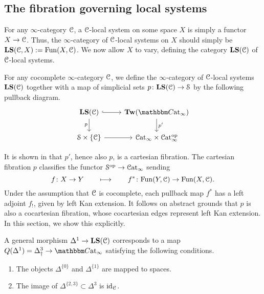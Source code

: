 \documentclass[main.tex]{subfiles}
\begin{document}
\subsection{The fibration governing local systems}
\label{ssc:the_fibration}

For any $\infty$-category $\mathcal{C}$, a $\mathcal{C}$-local system on some space $X$ is simply a functor $X \to \mathcal{C}$. Thus, the $\infty$-category of $\mathcal{C}$-local systems on $X$ should simply be $\mathbf{LS}(\mathcal{C}, X):=\mathrm{Fun}(X, \mathcal{C})$. We now allow $X$ to vary, defining the category $\mathbf{LS}(\mathcal{C})$ of $\mathcal{C}$-local systems.

\begin{definition}
  For any cocomplete $\infty$-category $\mathcal{C}$, we define the $\infty$-category of $\mathcal{C}$-local systems $\mathbf{LS}(\mathcal{C})$ together with a map of simplicial sets $p\colon \mathbf{LS}(\mathcal{C}) \to \mathcal{S}$ by the following pullback diagram.
  \begin{equation*}
    \begin{tikzcd}
      \LS(\category{C})
      \arrow[r, hook]
      \arrow[d, swap, "p"]
      & \Tw(\ICCat)
      \arrow[d, "p'"]
      \\
      \S \times \{\category{C}\}
      \arrow[r]
      & \ICat \times \ICat\op
    \end{tikzcd}
  \end{equation*}
\end{definition}

It is shown in \cite{garcia2020enhanced} that $p'$, hence also $p$, is a cartesian fibration. The cartesian fibration $p$ classifies the functor $\mathcal{S}^{\mathrm{op}} \to \mathcal{C}\mathrm{at}_{\infty}$ sending
\begin{equation*}
  f\colon X \to Y \qquad \longmapsto \qquad f^{*}\colon \mathrm{Fun}(Y, \mathcal{C}) \to \mathrm{Fun}(X, \mathcal{C}).
\end{equation*}
Under the assumption that $\mathcal{C}$ is cocomplete, each pullback map $f^{*}$ has a left adjoint $f_{!}$, given by left Kan extension. It follows on abstract grounds that $p$ is also a cocartesian fibration, whose cocartesian edges represent left Kan extension. In this section, we show this explicitly.

A general morphism $\Delta^{1} \to \mathbf{LS}(\mathcal{C})$ corresponds to a map $Q(\Delta^{1}) = \Delta^{3}_{\dagger} \to \ICCat$ satisfying the following conditions.
\begin{enumerate}
  \item The objects $\Delta^{\{0\}}$ and $\Delta^{\{1\}}$ are mapped to spaces.

  \item The image of $\Delta^{\{2,3\}} \subset \Delta^{3}$ is $\mathrm{id}_{\mathcal{C}}$.
\end{enumerate}
\end{document}
